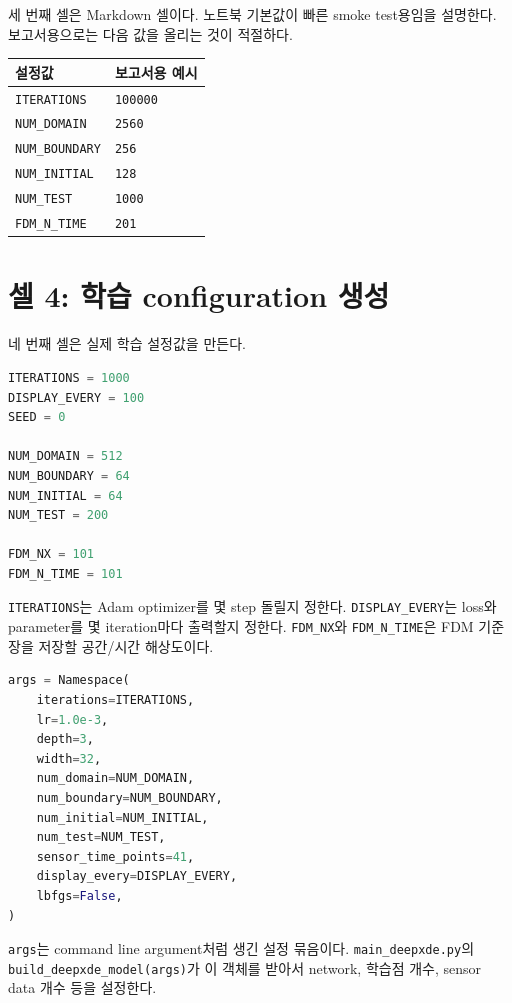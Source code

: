 \documentclass[11pt]{article}
\begin{document}
세 번째 셀은 Markdown 셀이다.
노트북 기본값이 빠른 smoke test용임을 설명한다.
보고서용으로는 다음 값을 올리는 것이 적절하다.

\begin{center}
\begin{tabular}{ll}
\toprule
설정값 & 보고서용 예시 \\
\midrule
\texttt{ITERATIONS} & \texttt{100000} \\
\texttt{NUM\_DOMAIN} & \texttt{2560} \\
\texttt{NUM\_BOUNDARY} & \texttt{256} \\
\texttt{NUM\_INITIAL} & \texttt{128} \\
\texttt{NUM\_TEST} & \texttt{1000} \\
\texttt{FDM\_N\_TIME} & \texttt{201} \\
\bottomrule
\end{tabular}
\end{center}

\section{셀 4: 학습 configuration 생성}

네 번째 셀은 실제 학습 설정값을 만든다.

\begin{lstlisting}[language=Python]
ITERATIONS = 1000
DISPLAY_EVERY = 100
SEED = 0

NUM_DOMAIN = 512
NUM_BOUNDARY = 64
NUM_INITIAL = 64
NUM_TEST = 200

FDM_NX = 101
FDM_N_TIME = 101
\end{lstlisting}

\texttt{ITERATIONS}는 Adam optimizer를 몇 step 돌릴지 정한다.
\texttt{DISPLAY\_EVERY}는 loss와 parameter를 몇 iteration마다 출력할지 정한다.
\texttt{FDM\_NX}와 \texttt{FDM\_N\_TIME}은 FDM 기준장을 저장할 공간/시간 해상도이다.

\begin{lstlisting}[language=Python]
args = Namespace(
    iterations=ITERATIONS,
    lr=1.0e-3,
    depth=3,
    width=32,
    num_domain=NUM_DOMAIN,
    num_boundary=NUM_BOUNDARY,
    num_initial=NUM_INITIAL,
    num_test=NUM_TEST,
    sensor_time_points=41,
    display_every=DISPLAY_EVERY,
    lbfgs=False,
)
\end{lstlisting}

\texttt{args}는 command line argument처럼 생긴 설정 묶음이다.
\texttt{main\_deepxde.py}의 \texttt{build\_deepxde\_model(args)}가 이 객체를 받아서 network, 학습점 개수, sensor data 개수 등을 설정한다.
\end{document}

